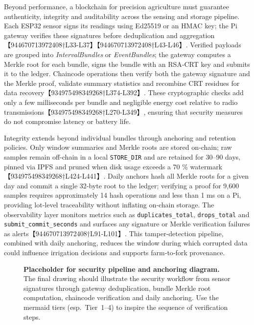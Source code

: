 \documentclass[12pt,onecolumn]{IEEEtran} %
\begin{document}
Beyond performance, a blockchain for precision agriculture must guarantee authenticity, integrity and auditability across the sensing and storage pipeline.  Each ESP32 sensor signs its readings using Ed25519 or an HMAC key; the Pi gateway verifies these signatures before deduplication and aggregation【944670713972408†L33-L37】【944670713972408†L43-L46】.  Verified payloads are grouped into \emph{IntervalBundles} or \emph{EventBundles}; the gateway computes a Merkle root for each bundle, signs the bundle with an RSA‑CRT key and submits it to the ledger.  Chaincode operations then verify both the gateway signature and the Merkle proof, validate summary statistics and recombine CRT residues for data recovery【934975498349268†L374-L392】.  These cryptographic checks add only a few milliseconds per bundle and negligible energy cost relative to radio transmissions【934975498349268†L270-L349】, ensuring that security measures do not compromise latency or battery life.

Integrity extends beyond individual bundles through anchoring and retention policies.  Only window summaries and Merkle roots are stored on‑chain; raw samples remain off‑chain in a local \texttt{STORE\_DIR} and are retained for 30–90 days, pinned via IPFS and pruned when disk usage exceeds a 70 \% watermark【934975498349268†L424-L441】.  Daily anchors hash all Merkle roots for a given day and commit a single 32‑byte root to the ledger; verifying a proof for 9,600 samples requires approximately 14 hash operations and less than 1 ms on a Pi, providing lot‑level traceability without inflating on‑chain storage.  The observability layer monitors metrics such as \texttt{duplicates\_total}, \texttt{drops\_total} and \texttt{submit\_commit\_seconds} and surfaces any signature or Merkle verification failures as alerts【944670713972408†L91-L101】.  This tamper‑detection pipeline, combined with daily anchoring, reduces the window during which corrupted data could influence irrigation decisions and supports farm‑to‑fork provenance.

\begin{figure}[h]
  \centering
  \caption{\textbf{Placeholder for security pipeline and anchoring diagram.}  The final drawing should illustrate the security workflow from sensor signatures through gateway deduplication, bundle Merkle root computation, chaincode verification and daily anchoring.  Use the mermaid tiers (esp.~Tier~1–4) to inspire the sequence of verification steps.}
  \label{fig:security-pipeline}
\end{figure}
\end{document}
